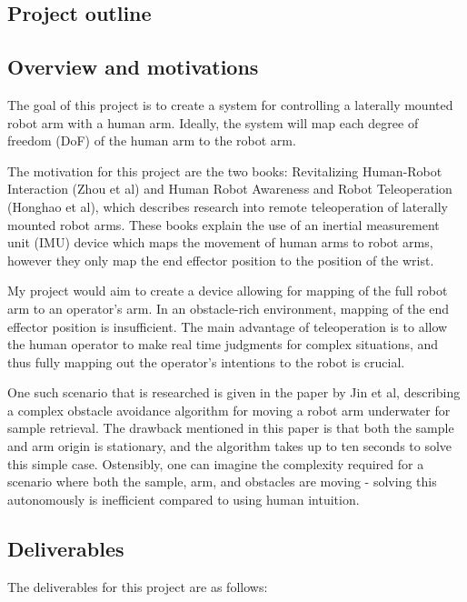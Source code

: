 \begin{uomappendix} 
    \section{Project outline}
    \subsection{Overview and motivations}
    The goal of this project is to create a system for controlling a laterally mounted robot arm with a human arm.
    Ideally, the system will map each degree of freedom (DoF) of the human arm to the robot arm.
    
    The motivation for this project are the two books: Revitalizing Human-Robot Interaction (Zhou et al) and Human Robot Awareness and Robot Teleoperation (Honghao et al), which describes research into remote
    teleoperation of laterally mounted robot arms. 
    These books explain the use of an inertial measurement unit (IMU) device which maps the movement of human arms to robot arms, however they only map the end
    effector position to the position of the wrist.

    My project would aim to create a device allowing for mapping of the full robot arm to an operator's arm. In an
    obstacle-rich environment, mapping of the end effector position is insufficient. The main advantage of
    teleoperation is to allow the human operator to make real time judgments for complex situations, and thus
    fully mapping out the operator's intentions to the robot is crucial.
    
    One such scenario that is researched is given in the paper by Jin et al, describing a complex obstacle
    avoidance algorithm for moving a robot arm underwater for sample retrieval. The drawback mentioned in this
    paper is that both the sample and arm origin is stationary, and the algorithm takes up to ten seconds to solve
    this simple case. Ostensibly, one can imagine the complexity required for a scenario where both the sample,
    arm, and obstacles are moving - solving this autonomously is inefficient compared to using human intuition.
    
    \subsection{Deliverables}
    The deliverables for this project are as follows:


\end{uomappendix}
